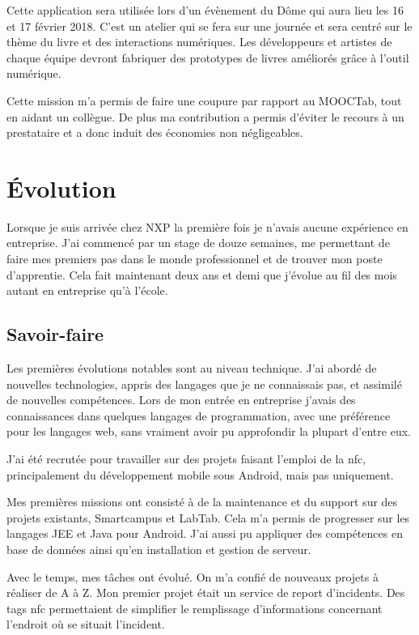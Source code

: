 \documentclass[french,12pt,a4paper,titlepage,openright,openbib]{report}
\begin{document}
Cette application sera utilisée lors d'un évènement du Dôme \cite{website:ledome} qui aura lieu les 16 et 17 février 2018. C'est un atelier qui se fera sur une journée et sera centré sur le thème du livre et des interactions numériques. Les développeurs et artistes de chaque équipe devront fabriquer des prototypes de livres améliorés grâce à l'outil numérique.

Cette mission m'a permis de faire une coupure par rapport au MOOCTab, tout en aidant un collègue. De plus ma contribution a permis d'éviter le recours à un prestataire et a donc induit des économies non négligeables.
\chapter{Évolution}
Lorsque je suis arrivée chez NXP la première fois je n'avais aucune expérience en entreprise. J'ai commencé par un stage de douze semaines, me permettant de faire mes premiers pas dans le monde professionnel et de trouver mon poste d'apprentie.
Cela fait maintenant deux ans et demi que j'évolue au fil des mois autant en entreprise qu'à l'école.
\section{Savoir-faire}
Les premières évolutions notables sont au niveau technique. J'ai abordé de nouvelles technologies, appris des langages que je ne connaissais pas, et assimilé de nouvelles compétences.
Lors de mon entrée en entreprise j'avais des connaissances dans quelques langages de programmation, avec une préférence pour les langages web, sans vraiment avoir pu approfondir la plupart d'entre eux.

J'ai été recrutée pour travailler sur des projets faisant l'emploi de la \gls{nfc}, principalement du développement mobile sous Android, mais pas uniquement.

Mes premières missions ont consisté à de la maintenance et du support sur des projets existants, Smartcampus et LabTab. Cela m'a permis de progresser sur les langages JEE et Java pour Android. J'ai aussi pu appliquer des compétences en base de données ainsi qu'en installation et gestion de serveur.

Avec le temps, mes tâches ont évolué. On m'a confié de nouveaux projets à réaliser de A à Z.
Mon premier projet était un service de report d'incidents. Des tags \gls{nfc} permettaient de simplifier le remplissage d'informations concernant l'endroit où se situait l'incident.
\end{document}
